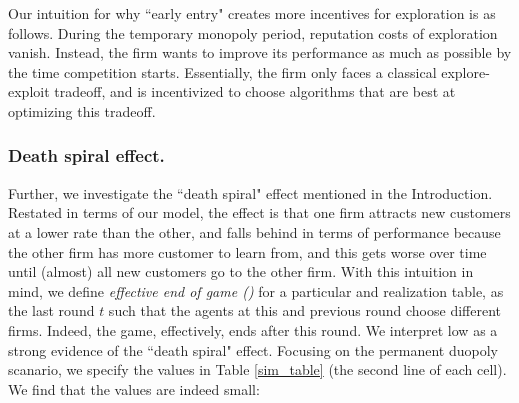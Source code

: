 \documentclass[../competing_bandits.tex]{subfiles}
\begin{document}

Our intuition for why ``early entry" creates more incentives for exploration is as follows. During the temporary monopoly period, reputation costs of exploration vanish. Instead, the firm wants to improve its performance as much as possible by the time competition starts. Essentially, the firm only faces a classical explore-exploit tradeoff, and is incentivized to choose algorithms that are best at optimizing this tradeoff.



\subsubsection{Death spiral effect.}
Further, we investigate the ``death spiral" effect mentioned in the Introduction. Restated in terms of our model, the effect is that one firm attracts new customers at a lower rate than the other, and falls behind in terms of performance because the other firm has more customer to learn from, and this gets worse over time until (almost) all new customers go to the other firm. With this intuition in mind, we define  \textit{effective end of game (\Eeog)} for a particular \MRV and realization table, as the last round $t$ such that the agents at this and previous round choose different firms. Indeed, the game, effectively, ends after this round. We interpret low \Eeog as a strong evidence of the ``death spiral" effect. Focusing on the permanent duopoly scanario, we specify the \Eeog values in Table \ref{sim_table} (the second line of each cell). We find that the \Eeog values are indeed small:
\end{document}
